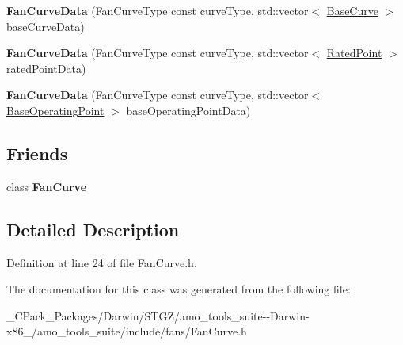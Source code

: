 \begin{DoxyCompactItemize}
{\bfseries Fan\+Curve\+Data} (Fan\+Curve\+Type const curve\+Type, std\+::vector$<$ \hyperlink{struct_fan_curve_data_1_1_base_curve}{Base\+Curve} $>$ base\+Curve\+Data)
\item 
\mbox{\label{class_fan_curve_data_aab50cc3aa6ac0208d02691af715d72bb}} 
{\bfseries Fan\+Curve\+Data} (Fan\+Curve\+Type const curve\+Type, std\+::vector$<$ \hyperlink{struct_fan_curve_data_1_1_rated_point}{Rated\+Point} $>$ rated\+Point\+Data)
\item 
\mbox{\label{class_fan_curve_data_a06a924f8d9b61eabc3fcaf2b32fc9bff}} 
{\bfseries Fan\+Curve\+Data} (Fan\+Curve\+Type const curve\+Type, std\+::vector$<$ \hyperlink{struct_fan_curve_data_1_1_base_operating_point}{Base\+Operating\+Point} $>$ base\+Operating\+Point\+Data)
\end{DoxyCompactItemize}
\subsection*{Friends}
\begin{DoxyCompactItemize}
\item 
\mbox{\label{class_fan_curve_data_a602ac04d4d30425e649d81550cbbc48a}} 
class {\bfseries Fan\+Curve}
\end{DoxyCompactItemize}


\subsection{Detailed Description}


Definition at line 24 of file Fan\+Curve.\+h.



The documentation for this class was generated from the following file\+:\begin{DoxyCompactItemize}
\item 
\+\_\+\+C\+Pack\+\_\+\+Packages/\+Darwin/\+S\+T\+G\+Z/amo\+\_\+tools\+\_\+suite-\/-\/\+Darwin-\/x86\+\_/amo\+\_\+tools\+\_\+suite/include/fans/Fan\+Curve.\+h\end{DoxyCompactItemize}
